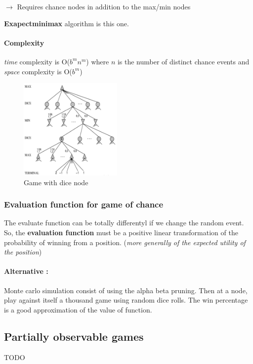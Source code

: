 $\rightarrow$ Requires chance nodes in addition to the max/min nodes

\textbf{Exapectminimax} algorithm is this one.

\paragraph{Complexity} \textit{time} complexity is O($b^m n^m$) where $n$
is the number of distinct chance events and \textit{space} complexity is O($b^m$)

\begin{figure}[h]
    \centering
    \includegraphics[width=5cm]{stochastic.png}
    \caption{Game with dice node}
\end{figure}


\subsubsection{Evaluation  function for  game  of  chance} 

The  evaluate function  can  be  totally differentyl  if  we change  the
random event.  So, the \textbf{evaluation  function} must be  a positive
linear transformation  of the  probability of  winning from  a position.
(\textit{more generally of the expected utility of the position})

\paragraph{Alternative :} Monte carlo simulation
consist of using the alpha beta pruning. Then at a node,  play against itself a thousand game using random 
dice rolls. The win percentage is a good approximation of the value of function. 



\subsection{Partially observable games}
TODO %

